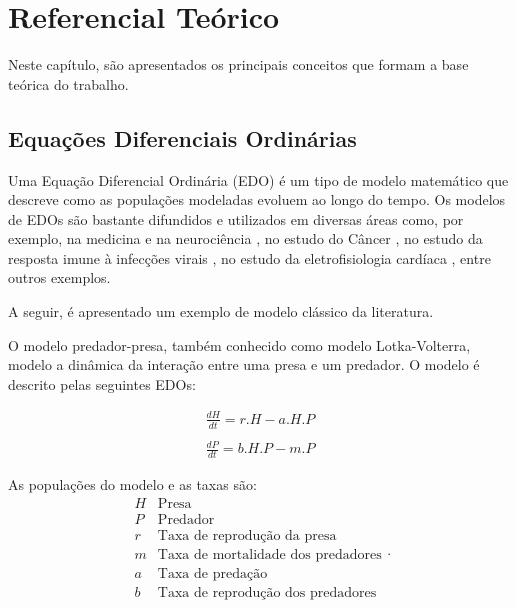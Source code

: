 \documentclass[
	12pt,				%
	openright,			%
	oneside,			%
	a4paper,			%
	main=brazil,
	english,			%
	]{ufsj-abntex2}
\begin{document}
\chapter{Referencial Teórico}
\label{chap:referencial}

Neste capítulo, são apresentados os principais conceitos que formam a base teórica do trabalho. 

\section{Equações Diferenciais Ordinárias}

Uma Equação Diferencial Ordinária (EDO) é um tipo de modelo matemático que descreve como as populações modeladas evoluem ao longo do tempo. Os modelos de EDOs são bastante difundidos e utilizados em diversas áreas como, por exemplo, na medicina e na neurociência \cite{ADOMIAN1995107}, no estudo do Câncer \cite{spencer2004ordinary, talkington2018ordinary}, no estudo da resposta imune à infecções virais \cite{reis2021validated}, no estudo da eletrofisiologia cardíaca \cite{VIGMOND20083, bucelli2022mathematical}, entre outros exemplos. 

A seguir, é apresentado um exemplo de modelo clássico da literatura. 


O modelo predador-presa, também conhecido como modelo Lotka-Volterra, modelo a dinâmica da interação entre uma presa e um predador. O modelo é descrito pelas seguintes EDOs: 

\begin{equation}\label{eq:predadorpresa}
    \begin{array}{lr}
    \frac{dH}{dt} = r.H - a.H.P
    \\
    \\
    \frac{dP}{dt} = b.H.P - m.P
    \end{array}
\end{equation}

As populações do modelo e as taxas são: 
\[
    \begin{array}{lr}
    H & \text{Presa}\\
    P & \text{Predador}\\
    r & \text{Taxa de reprodução da presa}\\
    m & \text{Taxa de mortalidade dos predadores}\\
    a & \text{Taxa de predação}\\
    b & \text{Taxa de reprodução dos predadores}\\
    \end{array}.
\]
\end{document}
